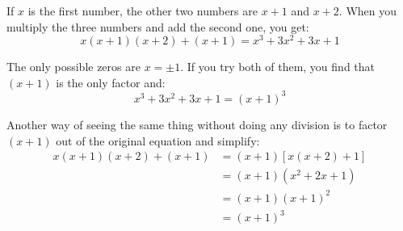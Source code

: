 \documentclass[fleqn,addpoints]{exam}
\begin{document}
\begin{questions}
        \begin{solution}
          If $x$ is the first number, the other two numbers are $x + 1$ and $x + 2$.  When you multiply the three
          numbers and add the second one, you get:
          \[
            x(x + 1)(x + 2) + (x + 1) = x^3 + 3x^2 + 3x + 1
          \]

          The only possible zeros are $x = \pm 1$.  If you try both of them, you find that $(x + 1)$ is the only
          factor and:
          \[
            x^3 + 3x^2 + 3x + 1 = (x + 1)^3
          \]

          Another way of seeing the same thing without doing any division is to factor $(x+1)$ out of the original
          equation and simplify:
          \begin{align*}
            x(x + 1)(x + 2) + (x + 1) &= (x+1) [ x(x+2) + 1 ] \\
                                      &= (x + 1) \left( x^2 + 2x + 1 \right) \\
                                      &= (x + 1) (x + 1)^2 \\
                                      &= (x + 1)^3 \\
          \end{align*}
          
        \end{solution}
  \end{questions}
\end{document}

